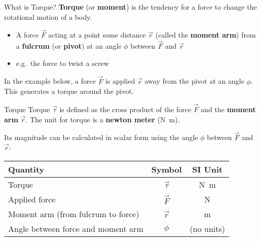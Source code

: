 \documentclass[12pt,compress,aspectratio=169]{beamer}
\begin{document}
\begin{frame}{What is Torque?}
  \textbf{Torque} (or \textbf{moment}) is the tendency for a force to change
  the rotational motion of a body.
  \begin{itemize}
  \item A force $\vec F$ acting at a point some distance $\vec r$ (called the
    \textbf{moment arm}) from a \textbf{fulcrum} (or \textbf{pivot}) at an angle
    $\phi$ between $\vec F$ and $\vec r$
  \item e.g.\ the force to twist a screw
  \end{itemize}
  In the example below, a force $\vec F$ is applied $\vec r$ away from the pivot
  at an angle $\phi$. This generates a torque around the pivot.
  \begin{center}
  \end{center}
\end{frame}



\begin{frame}{Torque}
  Torque $\vec\tau$ is defined as the cross product of the force $\vec F$ and
  the \textbf{moment arm} $\vec r$. The unit for torque is a \textbf{newton
    meter} (\si{\newton\metre}).


  \vspace{-.1in}Its magnitude can be calculated in scalar form
  using the angle $\phi$ between $\vec F$ and $\vec r$:

  \begin{center}
    \begin{tabular}{l|c|c}
      \rowcolor{pink}
      \textbf{Quantity} & \textbf{Symbol} & \textbf{SI Unit} \\ \hline
      Torque        & $\vec\tau$ & \si{\newton\metre} \\
      Applied force & $\vec F$   & \si\newton \\
      Moment arm (from fulcrum to force) & $\vec r$ & \si\metre \\
      Angle between force and moment arm & $\phi$ & (no units)
    \end{tabular}
  \end{center}
\end{frame}
\end{document}
